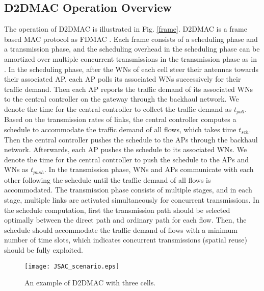 \documentclass[journal]{IEEEtran}
\begin{document}
\subsection{D2DMAC Operation Overview}
The operation of D2DMAC is illustrated in Fig. \ref{frame}. D2DMAC is a frame based MAC protocol as
FDMAC \cite{mao}. Each frame consists of a scheduling phase and a transmission phase, and the scheduling overhead in the scheduling phase can be amortized over multiple concurrent transmissions in the transmission phase as in \cite{mao}. In the
scheduling phase, after the WNs of each cell steer their antennas towards their associated AP, each
AP polls its associated WNs successively for their traffic demand. Then each AP reports the traffic
demand of its associated WNs to the central controller on the gateway through the backhaul network.
We denote the time for the central controller to collect the traffic demand as ${t_{poll}}$. Based
on the transmission rates of links, the central controller computes a schedule to accommodate the
traffic demand of all flows, which takes time ${t_{sch}}$. Then the central controller pushes the
schedule to the APs through the backhaul network. Afterwards, each AP pushes the schedule to its
associated WNs. We denote the time for the central controller to push the schedule to the APs and
WNs as ${t_{push}}$. In the transmission phase, WNs and APs communicate with each other following
the schedule until the traffic demand of all flows is accommodated. The transmission phase consists
of multiple stages, and in each stage, multiple links are activated simultaneously for concurrent
transmissions. In the schedule computation, first the transmission path should be selected
optimally between the direct path and ordinary path for each flow. Then, the schedule should
accommodate the traffic demand of flows with a minimum number of time slots, which indicates
concurrent transmissions (spatial reuse) should be fully exploited.



\begin{figure} [htbp] \begin{center}
\texttt{[image: JSAC\_scenario.eps]}
\end{center}
\caption{An example of D2DMAC with three cells.} \label{scenario}
\end{figure}
\end{document}
